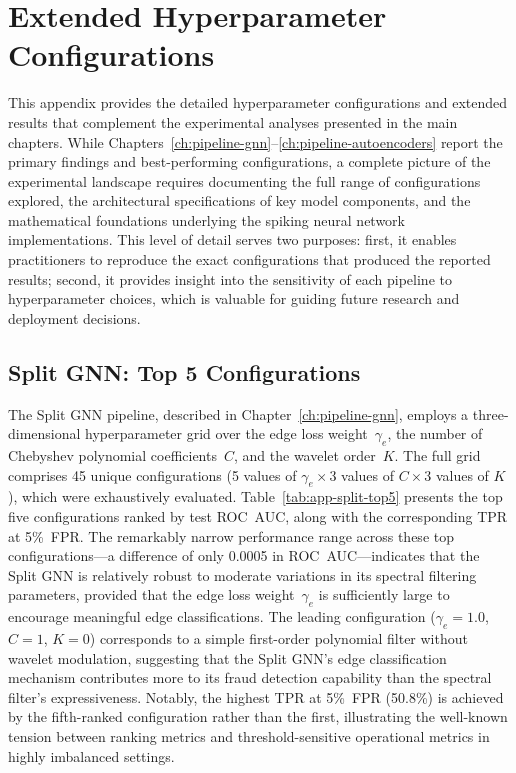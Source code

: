\chapter{Extended Hyperparameter Configurations}
\label{app:extended-results}

This appendix provides the detailed hyperparameter configurations and extended results that complement the experimental analyses presented in the main chapters. While Chapters~\ref{ch:pipeline-gnn}--\ref{ch:pipeline-autoencoders} report the primary findings and best-performing configurations, a complete picture of the experimental landscape requires documenting the full range of configurations explored, the architectural specifications of key model components, and the mathematical foundations underlying the spiking neural network implementations. This level of detail serves two purposes: first, it enables practitioners to reproduce the exact configurations that produced the reported results; second, it provides insight into the sensitivity of each pipeline to hyperparameter choices, which is valuable for guiding future research and deployment decisions.

\section{Split GNN: Top 5 Configurations}
\label{app:split-gnn-top5}

The Split GNN pipeline, described in Chapter~\ref{ch:pipeline-gnn}, employs a three-dimensional hyperparameter grid over the edge loss weight~$\gamma_e$, the number of Chebyshev polynomial coefficients~$C$, and the wavelet order~$K$. The full grid comprises 45 unique configurations (5 values of $\gamma_e \times 3$ values of $C \times 3$ values of $K$), which were exhaustively evaluated. Table~\ref{tab:app-split-top5} presents the top five configurations ranked by test ROC~AUC, along with the corresponding TPR at 5\%~FPR. The remarkably narrow performance range across these top configurations---a difference of only 0.0005 in ROC~AUC---indicates that the Split GNN is relatively robust to moderate variations in its spectral filtering parameters, provided that the edge loss weight~$\gamma_e$ is sufficiently large to encourage meaningful edge classifications. The leading configuration ($\gamma_e = 1.0$, $C = 1$, $K = 0$) corresponds to a simple first-order polynomial filter without wavelet modulation, suggesting that the Split GNN's edge classification mechanism contributes more to its fraud detection capability than the spectral filter's expressiveness. Notably, the highest TPR at 5\%~FPR (50.8\%) is achieved by the fifth-ranked configuration rather than the first, illustrating the well-known tension between ranking metrics and threshold-sensitive operational metrics in highly imbalanced settings.

